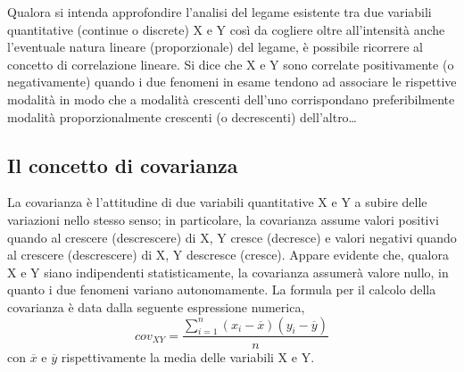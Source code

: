 Qualora si intenda approfondire l'analisi del legame esistente tra due 
variabili quantitative (continue o discrete) X e Y così da cogliere oltre 
all'intensità anche l'eventuale natura lineare (proporzionale) del legame, 
è possibile ricorrere al concetto di correlazione lineare. Si dice che X e 
Y sono correlate positivamente (o negativamente) quando i due fenomeni in 
esame tendono ad associare le rispettive modalità in modo che a modalità 
crescenti dell'uno corrispondano preferibilmente modalità proporzionalmente 
crescenti (o decrescenti) dell'altro\dots 

\subsection{Il concetto di covarianza}

La covarianza è l'attitudine di due variabili quantitative X e Y a subire 
delle variazioni nello stesso senso; in particolare, la covarianza assume 
valori positivi quando al crescere (descrescere) di X, Y cresce (decresce) 
e valori negativi quando al crescere (descrescere) di X, Y descresce 
(cresce). Appare evidente che, qualora X e Y siano indipendenti 
statisticamente, la covarianza assumerà valore nullo, in quanto i due 
fenomeni variano autonomamente. 
La formula per il calcolo della covarianza è data dalla seguente  
espressione numerica,
$$cov_{XY}=\frac{\sum_{i=1}^{n}(x_i-\overline{x})(y_i-\overline{y})}{n}$$
con $\overline{x}$ e $\overline{y}$ rispettivamente la media delle 
variabili X e Y.


